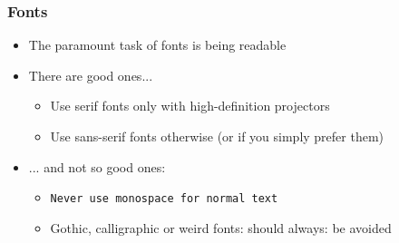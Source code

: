 \begin{frame}
	\frametitle{Fonts}
	\begin{itemize}
		\item The paramount task of fonts is being readable
		\item There are good ones...
		      \begin{itemize}
			      \item {\textrm{Use serif fonts only with high-definition projectors}}
			      \item {\textsf{Use sans-serif fonts otherwise (or if you simply prefer
				            them)}}
		      \end{itemize}
		\item ... and not so good ones:
		      \begin{itemize}
			      \item {\texttt{Never use monospace for normal text}}
			      \item {\frakfamily Gothic, calligraphic or weird fonts: should always: be
			            avoided}
		      \end{itemize}
	\end{itemize}
\end{frame}